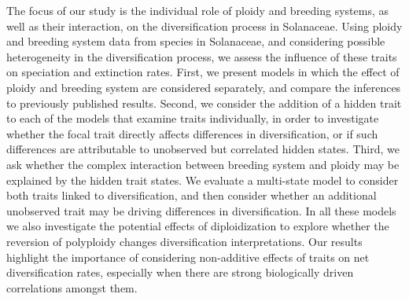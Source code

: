 The focus of our study is the individual role of ploidy and breeding systems, as well as their interaction, on the diversification process in Solanaceae. %
Using ploidy and breeding system data from species in Solanaceae, and considering possible heterogeneity in the diversification process, we assess  the influence of these traits on speciation and extinction rates.
First, we present models in which the effect of ploidy and breeding system are considered separately, and compare the inferences to previously published results. 
Second, we consider the addition of a hidden trait to each of the models that examine traits individually, in order to investigate whether the focal trait directly affects differences in diversification, or if such differences are attributable to unobserved but correlated hidden states.
Third, we ask whether the complex interaction between breeding system and ploidy may be explained by the hidden trait states. 
We evaluate a multi-state model to consider both traits linked to diversification, and then consider whether an additional unobserved trait may be driving differences in diversification. In all these models we also investigate the potential effects of diploidization to explore whether the reversion of polyploidy changes diversification interpretations. 
Our results highlight the importance of considering non-additive effects of traits on net diversification rates, especially when there are strong biologically driven correlations amongst them.




